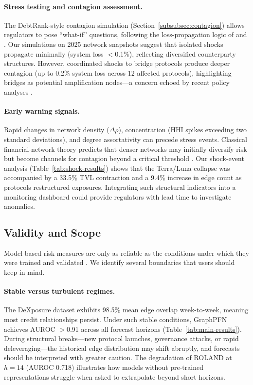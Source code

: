 \paragraph{Stress testing and contagion assessment.}
The DebtRank-style contagion simulation (Section~\ref{subsubsec:contagion}) allows regulators to pose ``what-if'' questions, following the loss-propagation logic of \cite{EisenbergNoe2001} and \cite{BattistonEtAl2012DebtRank}. Our simulations on 2025 network snapshots suggest that isolated shocks propagate minimally (system loss $<$0.1\%), reflecting diversified counterparty structures. However, coordinated shocks to bridge protocols produce deeper contagion (up to 0.2\% system loss across 12 affected protocols), highlighting bridges as potential amplification nodes---a concern echoed by recent policy analyses \citep{Aufiero2025}.

\paragraph{Early warning signals.}
Rapid changes in network density ($\Delta\rho$), concentration (HHI spikes exceeding two standard deviations), and degree assortativity can precede stress events. Classical financial-network theory predicts that denser networks may initially diversify risk but become channels for contagion beyond a critical threshold \citep{Acemoglu2013,GaiKapadia2010Contagion}. Our shock-event analysis (Table~\ref{tab:shock-results}) shows that the Terra/Luna collapse was accompanied by a 33.5\% TVL contraction and a 9.4\% increase in edge count as protocols restructured exposures. Integrating such structural indicators into a monitoring dashboard could provide regulators with lead time to investigate anomalies.


\subsection{Validity and Scope}
\label{subsec:validity}

Model-based risk measures are only as reliable as the conditions under which they were trained and validated \citep{MullainathanSpiess2017}. We identify several boundaries that users should keep in mind.

\paragraph{Stable versus turbulent regimes.}
The DeXposure dataset exhibits 98.5\% mean edge overlap week-to-week, meaning most credit relationships persist. Under such stable conditions, GraphPFN achieves AUROC $>$0.91 across all forecast horizons (Table~\ref{tab:main-results}). During structural breaks---new protocol launches, governance attacks, or rapid deleveraging---the historical edge distribution may shift abruptly, and forecasts should be interpreted with greater caution. The degradation of ROLAND at $h=14$ (AUROC 0.718) illustrates how models without pre-trained representations struggle when asked to extrapolate beyond short horizons.

